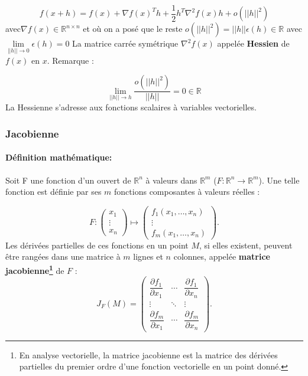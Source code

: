 	\begin{equation}
		f(x + h) = f(x)+\nabla f(x)^Th + \frac{1}{2}h^T\nabla^2f(x)h+o(||h||^2)
	\end{equation}
	avec$\nabla f(x)\in \mathbb{R}^{n\times n}$ et où on a posé que le reste 
	$ o(||h||^2) =||h|| \epsilon(h) \in \mathbb{R} $ avec 
	$\lim\limits_{||h|| \to 0} \epsilon(h) = 0 $
	La matrice carrée symétrique $\nabla^2 f(x)$ appelée \textbf{Hessien} de $f(x)$ en $x$. Remarque :
	
	$$
		\lim\limits_{||h|| \to h} \frac{o(||h||^2)}{||h||} = 0  \in \mathbb{R}
	$$
	La Hessienne s’adresse aux fonctions scalaires à variables vectorielles.
			
	\subsubsection{Jacobienne}
	\paragraph*{Définition mathématique:}
	Soit F une fonction d'un ouvert de $\mathbb{R}^{n}$ à valeurs dans $\mathbb{R}^{m}$ ($F:\mathbb{R}^{n}\to \mathbb {R}^{m}$). Une telle fonction est définie par ses $m$ fonctions composantes à valeurs réelles :
	
	$$ 
	{ F:
		{\begin{pmatrix}
			x_{1}\\\vdots \\
			x_{n}
		\end{pmatrix}}
		\longmapsto 
		{\begin{pmatrix}
			f_{1}(x_{1},\dots ,x_{n})\\
			\vdots \\f_{m}(x_{1},\dots ,x_{n})
		\end{pmatrix}}}.
	$$
	Les dérivées partielles de ces fonctions en un point $M$, si elles existent, peuvent être rangées dans une matrice à $m$ lignes et $n$ colonnes, appelée \textbf{matrice jacobienne\footnote{En analyse vectorielle, la matrice jacobienne est la matrice des dérivées partielles du premier ordre d'une fonction vectorielle en un point donné.}} de $F$ :
	$$
	J_{F}\left(M\right)={
		\begin{pmatrix}
			{\dfrac {\partial f_{1}}{\partial x_{1}}}&\cdots &{\dfrac {\partial f_{1}}{\partial x_{n}}}\\
			\vdots &\ddots &\vdots \\
			{\dfrac {\partial f_{m}}{\partial x_{1}}}&\cdots &{\dfrac {\partial f_{m}}{\partial x_{n}}}
		\end{pmatrix}}.
	$$
	
